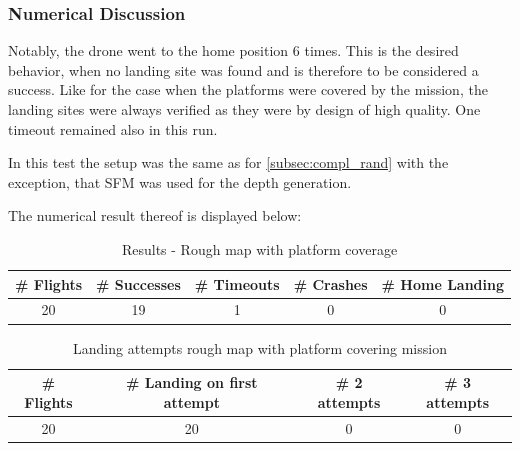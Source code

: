     \subsubsection{Numerical Discussion}

    Notably, the drone went to the home position 6 times. This is the desired behavior, when no landing site was found and is therefore to be considered a success. Like for the case when the platforms were covered by the mission, the landing sites were always verified as they were by design of high quality. One timeout remained also in this run.
    


    In this test the setup was the same as for \cref{subsec:compl_rand} with the exception, that SFM was used for the depth generation.

    The numerical result thereof is displayed below:

    \begin{table}[h]
        \begin{center}
            \caption{Results - Rough map with platform coverage}\vspace{1ex}
            \label{tab:result_rough_covered}
            \begin{tabular}{|c|c|c|c|c|}
            \hline
            \# Flights & \# Successes & \# Timeouts & \# Crashes & \# Home Landing\\ \hline \hline
            20 & 19 & 1 & 0 & 0 \\ %
            \hline
            \end{tabular}
        \end{center}
    \end{table}

    \begin{table}[h]
        \begin{center}
            \caption{Landing attempts rough map with platform covering mission}\vspace{1ex}
            \label{tab:land_nums_rough_coverage}
            \begin{tabular}{|c|c|c|c|}
            \hline
            \# Flights & \# Landing on first attempt & \# 2 attempts & \# 3 attempts\\ \hline \hline
            20 & 20 & 0 & 0 \\%
            \hline
            \end{tabular}
        \end{center}
    \end{table}

